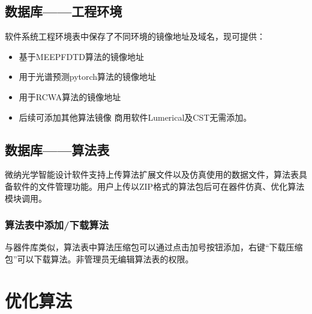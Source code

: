 \documentclass[letterpaper,10pt,english]{sphinxmanual}
\begin{document}
{{\subsection{数据库——工程环境}
\label{\detokenize{_u8f6f_u4ef6_u6a21_u5757_u4ecb_u7ecd/_u6570_u636e_u5e93/contents:id5}}
\sphinxAtStartPar
软件系统工程环境表中保存了不同环境的镜像地址及域名，现可提供：
\begin{itemize}
\item {} 
\sphinxAtStartPar
基于MEEP\sphinxhyphen{}FDTD算法的镜像地址

\item {} 
\sphinxAtStartPar
用于光谱预测pytorch算法的镜像地址

\item {} 
\sphinxAtStartPar
用于RCWA算法的镜像地址

\item {} 
\sphinxAtStartPar
后续可添加其他算法镜像
商用软件Lumerical及CST无需添加。

\end{itemize}


\subsection{数据库——算法表}
\label{\detokenize{_u8f6f_u4ef6_u6a21_u5757_u4ecb_u7ecd/_u6570_u636e_u5e93/contents:id6}}
\sphinxAtStartPar
微纳光学智能设计软件支持上传算法扩展文件以及仿真使用的数据文件，算法表具备软件的文件管理功能。用户上传以ZIP格式的算法包后可在器件仿真、优化算法模块调用。


\sphinxAtStartPar
{}





\sphinxAtStartPar
{}






\subsubsection{算法表中添加/下载算法}
\label{\detokenize{_u8f6f_u4ef6_u6a21_u5757_u4ecb_u7ecd/_u6570_u636e_u5e93/contents:id7}}
\sphinxAtStartPar
与器件库类似，算法表中算法压缩包可以通过点击加号按钮添加，右键“下载压缩包”可以下载算法。非管理员无编辑算法表的权限。

\sphinxstepscope


\section{优化算法}
\label{\detokenize{_u8f6f_u4ef6_u6a21_u5757_u4ecb_u7ecd/_u4f18_u5316_u7b97_u6cd5/contents:id1}}\label{\detokenize{_u8f6f_u4ef6_u6a21_u5757_u4ecb_u7ecd/_u4f18_u5316_u7b97_u6cd5/contents::doc}}

}}
\end{document}
